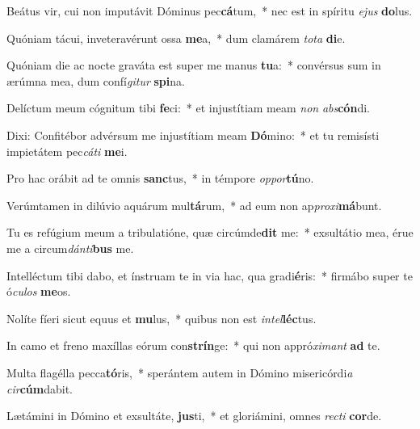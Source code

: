 \item Beátus vir, cui non imputávit Dóminus pec\textbf{cá}tum,~* nec est in spíritu \textit{e}\textit{jus} \textbf{do}lus.
\item Quóniam tácui, inveteravérunt ossa \textbf{me}a,~* dum clamárem \textit{to}\textit{ta} \textbf{di}e.
\item Quóniam die ac nocte graváta est super me manus \textbf{tu}a:~* convérsus sum in ærúmna mea, dum confí\textit{gi}\textit{tur} \textbf{spi}na.
\item Delíctum meum cógnitum tibi \textbf{fe}ci:~* et injustítiam meam \textit{non} \textit{abs}\textbf{cón}di.
\item Dixi: Confitébor advérsum me injustítiam meam \textbf{Dó}mino:~* et tu remisísti impietátem pec\textit{cá}\textit{ti} \textbf{me}i.
\item Pro hac orábit ad te omnis \textbf{sanc}tus,~* in témpore \textit{op}\textit{por}\textbf{tú}no.
\item Verúmtamen in dilúvio aquárum mul\textbf{tá}rum,~* ad eum non ap\textit{pro}\textit{xi}\textbf{má}bunt.
\item Tu es refúgium meum a tribulatióne, quæ circúmde\textbf{dit} me:~* exsultátio mea, érue me a circum\textit{dán}\textit{ti}\textbf{bus} me.
\item Intelléctum tibi dabo, et ínstruam te in via hac, qua gradi\textbf{é}ris:~* firmábo super te ó\textit{cu}\textit{los} \textbf{me}os.
\item Nolíte fíeri sicut equus et \textbf{mu}lus,~* quibus non est \textit{in}\textit{tel}\textbf{léc}tus.
\item In camo et freno maxíllas eórum con\textbf{strín}ge:~* qui non appró\textit{xi}\textit{mant} \textbf{ad} te.
\item Multa flagélla pecca\textbf{tó}ris,~* sperántem autem in Dómino misericórdi\textit{a} \textit{cir}\textbf{cúm}dabit.
\item Lætámini in Dómino et exsultáte, \textbf{jus}ti,~* et gloriámini, omnes \textit{rec}\textit{ti} \textbf{cor}de.
